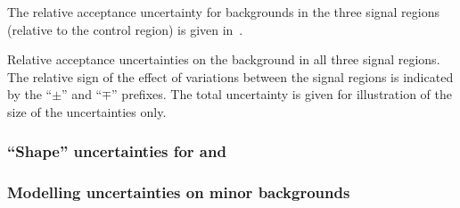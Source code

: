 The relative acceptance uncertainty for \ttbar backgrounds in the
three signal regions (relative to the \ZHF control region) is given
in~.

\begin{table}[htbp]
  \centering

  

  \caption{Relative acceptance uncertainties on the \ttbar background
    in all three signal regions. The relative sign of the effect of
    variations between the signal regions is indicated by the
    ``$\pm$'' and ``$\mp$'' prefixes. The total uncertainty is given
    for illustration of the size of the uncertainties only.}
  \label{tab:uncertainties_ttbar_extrapol}
\end{table}

\subsubsection{``Shape'' uncertainties for \ZHF and \ttbar}

%
%
%
%

\subsubsection{Modelling uncertainties on minor backgrounds}

